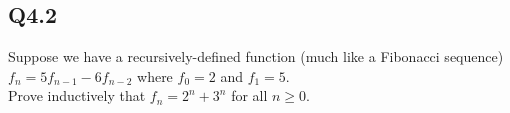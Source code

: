 \documentclass{article}
\begin{document}
\subsection*{Q4.2}
Suppose we have a recursively-defined function (much like a Fibonacci sequence) $f_n=5f_{n-1}-6f_{n-2}$ where $f_0=2$ and $f_1=5$.
\\ Prove inductively that $f_n=2^n+3^n$ for all $n\geq0$.
\newpage
\end{document}
